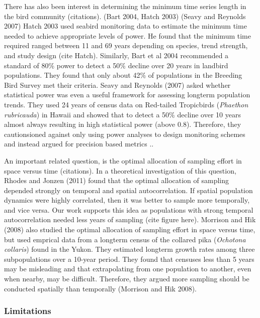 \documentclass[12pt,]{article}
\begin{document}
There has also been interest in determining the minimum time series
length in the bird community (citations). (Bart 2004, Hatch 2003) (Seavy
and Reynolds 2007) Hatch 2003 used seabird monitoring data to estimate
the minimum time needed to achieve appropriate levels of power. He found
that the minimum time required ranged between 11 and 69 years depending
on species, trend strength, and study design (cite Hatch). Similarly,
Bart et al 2004 recommended a standard of 80\% power to detect a 50\%
decline over 20 years in landbird populations. They found that only
about 42\% of populations in the Breeding Bird Survey met their
criteria. Seavy and Reynolds (2007) asked whether statistical power was
even a useful framework for assessing longterm population trends. They
used 24 years of census data on Red-tailed Tropicbirds
(\emph{Phaethon rubricauda}) in Hawaii and showed that to detect a 50\%
decline over 10 years almost always resulting in high statistical power
(above 0.8). Therefore, they cautionsioned against only using power
analyses to design monitoring schemes and instead argued for precision
based metrics ..

An important related question, is the optimal allocation of sampling
effort in space versus time (citations). In a theoretical investigation
of this question, Rhodes and Jonzen (2011) found that the optimal
allocation of sampling depended strongly on temporal and spatial
autocorrelation. If spatial population dynamics were highly correlated,
then it was better to sample more temporally, and vice versa. Our work
supports this idea as populations with strong temporal autocorrelation
needed less years of sampling (cite figure here). Morrison and Hik
(2008) also studied the optimal allocation of sampling effort in space
versus time, but used emprical data from a longterm census of the
collared pika (\emph{Ochotona collaris}) found in the Yukon. They
estimated longterm growth rates among three subpopulations over a
10-year period. They found that censuses less than 5 years may be
misleading and that extrapolating from one population to another, even
when nearby, may be difficult. Therefore, they argued more sampling
should be conducted spatially than temporally (Morrison and Hik 2008).

\subsubsection{Limitations}\label{limitations}
\end{document}
